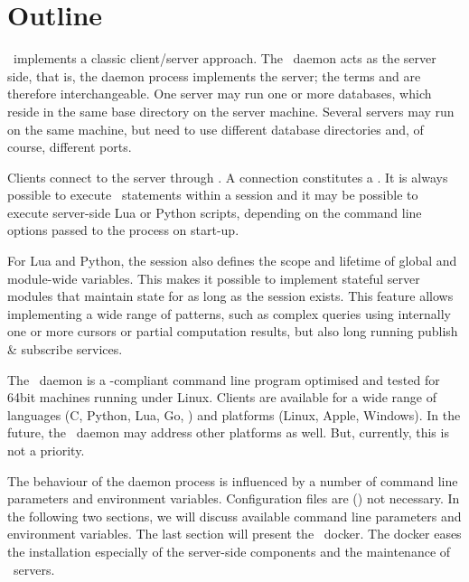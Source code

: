 \section{Outline}
\nowdb\ implements a classic client/server approach.
The \nowdb\ daemon acts as the server side,
that is, the daemon process implements the server;
the terms  and 
are therefore interchangeable.
One server may run one or more databases,
which reside in the same base directory
on the server machine.
Several servers may run on the same machine,
but need to use different database directories
and, of course, different ports.

Clients connect to the server
through .
A  connection
constitutes a .
It is always possible to execute \sql\
statements within a session and
it may be possible to execute
server-side Lua or Python scripts,
depending on the command line options
passed to the process on start-up.

For Lua and Python, the session also
defines the scope and lifetime
of global and module-wide variables.
This makes it possible to implement
stateful server modules that maintain
state for as long as the session exists.
This feature allows implementing
a wide range of patterns,
such as complex queries using internally
one or more cursors or partial computation results,
but also long running publish \& subscribe
services.

The \nowdb\ daemon is a -compliant
command line program optimised and tested
for 64bit machines running under Linux.
Clients are available for a wide range
of languages (C, Python, Lua, Go, \etc)
and platforms (Linux, Apple, Windows).
In the future, the \nowdb\ daemon may
address other platforms as well.
But, currently, this is not a priority.

The behaviour of the daemon process
is influenced by a number
of command line parameters and
environment variables.
Configuration files are ()
not necessary.
In the following two sections,
we will discuss available
command line parameters and
environment variables.
The last section will present
the \nowdb\ docker.
The docker eases the installation
especially of the server-side components
and the maintenance of \nowdb\ servers.

